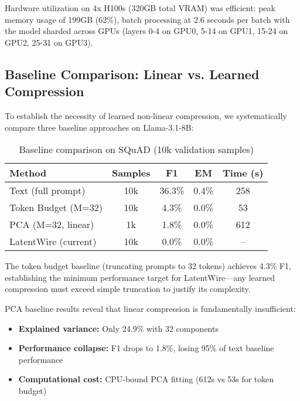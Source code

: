 \documentclass{article}
\begin{document}
Hardware utilization on 4x H100s (320GB total VRAM) was efficient: peak memory usage of 199GB (62\%), batch processing at 2.6 seconds per batch with the model sharded across GPUs (layers 0-4 on GPU0, 5-14 on GPU1, 15-24 on GPU2, 25-31 on GPU3).

\subsection{Baseline Comparison: Linear vs. Learned Compression}

To establish the necessity of learned non-linear compression, we systematically compare three baseline approaches on Llama-3.1-8B:

\begin{table}[h]
\caption{Baseline comparison on SQuAD (10k validation samples)}
\label{tab:baseline_comparison}
\vskip 0.15in
\begin{center}
\begin{small}
\begin{tabular}{lcccc}
\toprule
Method & Samples & F1 & EM & Time (s) \\
\midrule
Text (full prompt) & 10k & 36.3\% & 0.4\% & 258 \\
Token Budget (M=32) & 10k & 4.3\% & 0.0\% & 53 \\
PCA (M=32, linear) & 1k & 1.8\% & 0.0\% & 612 \\
\midrule
LatentWire (current) & 10k & 0.0\% & 0.0\% & -- \\
\bottomrule
\end{tabular}
\end{small}
\end{center}
\vskip -0.1in
\end{table}

The token budget baseline (truncating prompts to 32 tokens) achieves 4.3\% F1, establishing the minimum performance target for LatentWire—any learned compression must exceed simple truncation to justify its complexity.

PCA baseline results reveal that linear compression is fundamentally insufficient:
\begin{itemize}
\item \textbf{Explained variance:} Only 24.9\% with 32 components
\item \textbf{Performance collapse:} F1 drops to 1.8\%, losing 95\% of text baseline performance
\item \textbf{Computational cost:} CPU-bound PCA fitting (612s vs 53s for token budget)
\end{itemize}
\end{document}
